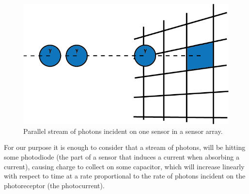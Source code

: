\documentclass[12pt,twoside,notitlepage]{report}
\begin{document}
            \begin{figure}[H]
                \centering
                \includegraphics[scale=0.5]{photon_stream}
                \caption{Parallel stream of photons incident on one sensor in a sensor array.}
                \label{fig:photon_stream}
            \end{figure}

            For our purpose it is enough to consider that a stream of photons, will be hitting some photodiode (the 
            part of a sensor that induces a current when absorbing a current), causing charge to collect on some 
            capacitor, which will increase linearly with respect to time at a rate proportional to the rate of photons 
            incident on the photoreceptor (the photocurrent). \cite{gamal2005cmos}
\end{document}
